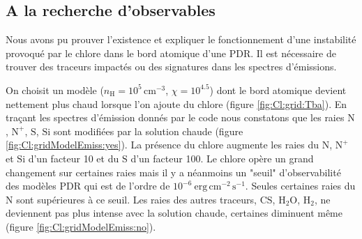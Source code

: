 
\subsection{A la recherche d'observables}

Nous avons pu prouver l'existence et expliquer le fonctionnement d'une instabilité provoqué par le chlore dans le bord atomique d'une PDR. Il est nécessaire de trouver des traceurs impactés ou des signatures dans les spectres d'émissions. \newline 

On choisit un modèle ($n_\mathrm{H}=10^5 \, \mathrm{cm}^{-3}$, $\chi=10^4.5$) dont le bord atomique devient nettement plus chaud lorsque l'on ajoute du chlore (figure \ref{fig:Cl:grid:Tba}). En traçant les spectres d'émission donnés par le code nous constatons que les raies $\mathrm{N}$, $\mathrm{N}^+$, $\mathrm{S}$, $\mathrm{Si}$ sont modifiées par la solution chaude (figure \ref{fig:Cl:gridModelEmiss:yes}). La présence du chlore augmente les raies du $\mathrm{N}$, $\mathrm{N}^+$ et $\mathrm{Si}$ d'un facteur 10 et du $\mathrm{S}$ d'un facteur 100. Le chlore opère un grand changement sur certaines raies mais il y a néanmoins un "seuil" d'observabilité des modèles PDR qui est de l'ordre de $10^{-6} \ \mathrm{erg}\,\mathrm{cm}^{-2}\,\mathrm{s}^{-1}$. Seules certaines raies du $\mathrm{N}$ sont supérieures à ce seuil. Les raies des autres traceurs, $\mathrm{CS}$, $\mathrm{H}_2\mathrm{O}$, $\mathrm{H}_2$, ne deviennent pas plus intense avec la solution chaude, certaines diminuent même (figure \ref{fig:Cl:gridModelEmiss:no}). \newline

